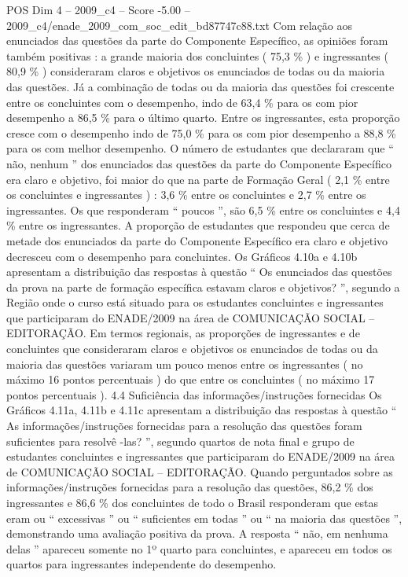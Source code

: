 \begin{textsample}{POS Dim 4 – 2009\_c4 – Score -5.00 – 2009\_c4/enade\_2009\_com\_soc\_edit\_bd87747c88.txt}
Com relação aos enunciados das questões da parte do Componente Específico, as opiniões foram também positivas : a grande maioria dos concluintes ( 75,3 \% ) e ingressantes ( 80,9 \% ) consideraram claros e objetivos os enunciados de todas ou da maioria das questões.
Já a combinação de todas ou da maioria das questões foi crescente entre os concluintes com o desempenho, indo de 63,4 \% para os com pior desempenho a 86,5 \% para o último quarto.
Entre os ingressantes, esta proporção cresce com o desempenho indo de 75,0 \% para os com pior desempenho a 88,8 \% para os com melhor desempenho.
O número de estudantes que declararam que “ não, nenhum ” dos enunciados das questões da parte do Componente Específico era claro e objetivo, foi maior do que na parte de Formação Geral ( 2,1 \% entre os concluintes e ingressantes ) : 3,6 \% entre os concluintes e 2,7 \% entre os ingressantes.
Os que responderam “ poucos ”, são 6,5 \% entre os concluintes e 4,4 \% entre os ingressantes.
A proporção de estudantes que respondeu que cerca de metade dos enunciados da parte do Componente Específico era claro e objetivo decresceu com o desempenho para concluintes.
Os Gráficos 4.10a e 4.10b apresentam a distribuição das respostas à questão “ Os enunciados das questões da prova na parte de formação específica estavam claros e objetivos? ”, segundo a Região onde o curso está situado para os estudantes concluintes e ingressantes que participaram do ENADE/2009 na área de COMUNICAÇÃO SOCIAL – EDITORAÇÃO.
Em termos regionais, as proporções de ingressantes e de concluintes que consideraram claros e objetivos os enunciados de todas ou da maioria das questões variaram um pouco menos entre os ingressantes ( no máximo 16 pontos percentuais ) do que entre os concluintes ( no máximo 17 pontos percentuais ). 4.4 Suficiência das informações/instruções fornecidas Os Gráficos 4.11a, 4.11b e 4.11c apresentam a distribuição das respostas à questão “ As informações/instruções fornecidas para a resolução das questões foram suficientes para resolvê -las? ”, segundo quartos de nota final e grupo de estudantes concluintes e ingressantes que participaram do ENADE/2009 na área de COMUNICAÇÃO SOCIAL – EDITORAÇÃO.
Quando perguntados sobre as informações/instruções fornecidas para a resolução das questões, 86,2 \% dos ingressantes e 86,6 \% dos concluintes de todo o Brasil responderam que estas eram ou “ excessivas ” ou “ suficientes em todas ” ou “ na maioria das questões ”, demonstrando uma avaliação positiva da prova.
A resposta “ não, em nenhuma delas ” apareceu somente no 1º quarto para concluintes, e apareceu em todos os quartos para ingressantes independente do desempenho.

\end{textsample}
